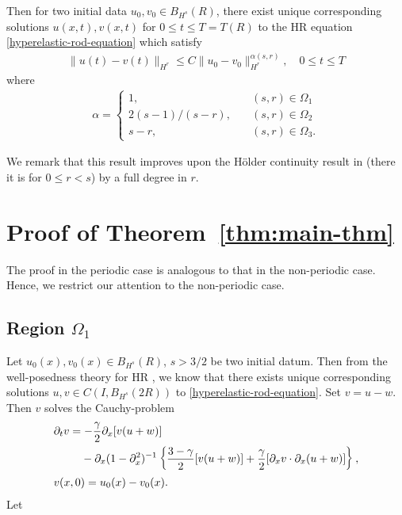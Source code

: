 \documentclass[12pt,reqno]{amsart}
\numberwithin{equation}{section}  %
\numberwithin{figure}{section}
\newcommand{\p}{\partial}
\begin{document}
%
%
Then for two initial data $u_{0}, v_{0} \in B_{H^{s}}(R)$, there exist unique
corresponding solutions $u(x,t), v(x,t)$ for $0 \le t \le T= T(R)$ to the
HR equation \eqref{hyperelastic-rod-equation} which satisfy 
%
%
\begin{equation*}
\begin{split}
  \| u(t) - v(t) \|_{H^{r}} \le C \| u_{0} - v_{0} \|_{H^{r}}^{\alpha(s, r)},
  \quad 0
  \le t \le T
\end{split}
\end{equation*}
%
%
where 
%
%
\begin{equation*}
\begin{split}
\alpha = 
\begin{cases}
   1, \quad & (s,r) \in \Omega_{1} 
  \\
   2(s-1)/(s-r),  \quad & (s, r) \in \Omega_{2}
  \\
   s-r, \quad & (s, r) \in \Omega_{3}.
\end{cases}
\end{split}
\end{equation*}
%

%
%
%
%
%
%
%
We remark that this result improves upon the H\"older continuity result in
\cite{Chen:2011fk} (there it is for $0 \le r < s$) by a full degree in $r$. 
%
%
%
%
\section{Proof of Theorem~\ref{thm:main-thm}}
%
%
The proof in the periodic case is analogous to that in the non-periodic case.
Hence, we restrict our attention to the non-periodic case. 
%
%
%
\subsection{Region $\Omega_{1}$} 
\label{ssec:reg-m-imp}
%
%
Let $u_{0}(x), v_{0}(x)
\in B_{H^{s}}(R)$, $s > 3/2$ be two initial datum. Then from
the well-posedness theory for HR \cite{Karapetyan:2010fk}, we
know that there exists unique corresponding solutions $u, v \in C(I,
B_{H^{s}}(2R))$ to \eqref{hyperelastic-rod-equation}.
Set $v=u-w$. Then $v$ solves the Cauchy-problem
%
%
\begin{align}
	\label{uniqueness-exp}
& \p_t v
=  -\frac{\gamma}{2} \p_x [v(u + w)] 
\\
\notag
& \phantom{\p_t v = }-\p_x (1 - \p_{x}^{2})^{-1} \left\{
\frac{3-\gamma}{2}[v(u+w)] + \frac{\gamma}{2}[\p_x v \cdot \p_x (u+w)]
\right\},
\\
& v(x,0) = u_{0}(x) - v_{0}(x).
\label{uniqueness-init-data}
\end{align}
%
%
%
Let
\end{document}
